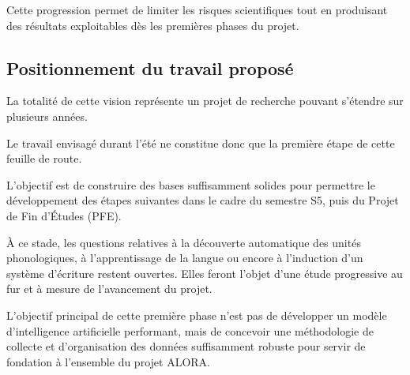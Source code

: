 Cette progression permet de limiter les risques scientifiques tout en produisant
des résultats exploitables dès les premières phases du projet.


\subsection{Positionnement du travail proposé}

La totalité de cette vision représente un projet de recherche pouvant
s'étendre sur plusieurs années.

Le travail envisagé durant l'été ne constitue donc que la première étape de
cette feuille de route.

L'objectif est de construire des bases suffisamment solides pour permettre le
développement des étapes suivantes dans le cadre du semestre S5, puis du Projet
de Fin d'Études (PFE).

À ce stade, les questions relatives à la découverte automatique des unités
phonologiques, à l'apprentissage de la langue ou encore à l'induction d'un
système d'écriture restent ouvertes. Elles feront l'objet d'une étude
progressive au fur et à mesure de l'avancement du projet.

\begin{objectif}

L'objectif principal de cette première phase n'est pas de développer un modèle
d'intelligence artificielle performant, mais de concevoir une méthodologie de
collecte et d'organisation des données suffisamment robuste pour servir de
fondation à l'ensemble du projet ALORA.

\end{objectif}
